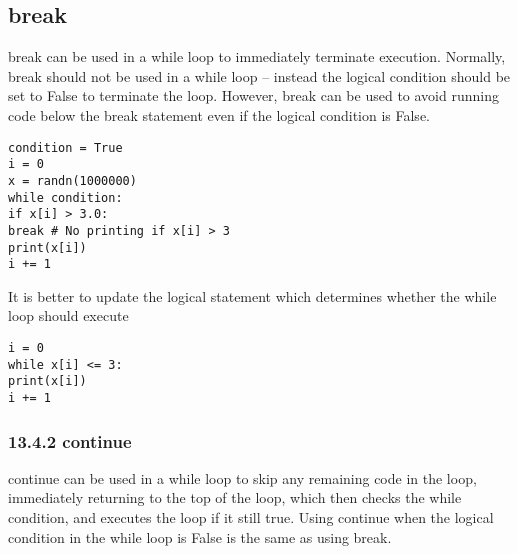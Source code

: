 \documentclass[KSmain.tex]{subfiles}
\begin{document}
\subsection{break}
break can be used in a while loop to immediately terminate execution. Normally, break should not be
used in a while loop – instead the logical condition should be set to False to terminate the loop. However,
break can be used to avoid running code below the break statement even if the logical condition is False.

\begin{framed}
\begin{verbatim}
condition = True
i = 0
x = randn(1000000)
while condition:
if x[i] > 3.0:
break # No printing if x[i] > 3
print(x[i])
i += 1
\end{verbatim}
\end{framed}

It is better to update the logical statement which determines whether the while loop should execute

\begin{framed}
\begin{verbatim}
i = 0
while x[i] <= 3:
print(x[i])
i += 1
\end{verbatim}
\end{framed}
\subsubsection{13.4.2 continue}
continue can be used in a while loop to skip any remaining code in the loop, immediately returning to the
top of the loop, which then checks the while condition, and executes the loop if it still true. Using continue
when the logical condition in the while loop is False is the same as using break.
\end{document}

